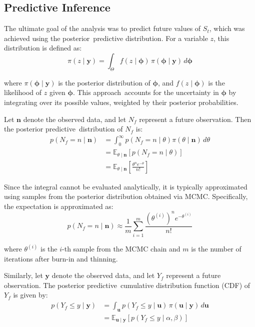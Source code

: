 \documentclass{Class/julia}
\begin{document}
\begin{figure}[!ht]
\end{figure}

\subsection{Predictive Inference}

The ultimate goal of the analysis was to predict future values of \( S_t \), which was achieved using the posterior~predictive distribution. For a variable \( z \), this distribution is defined as:
\[
\pi(z \mid \mathbf{y}) = \int_{\Theta} f(z \mid \mathbf{\phi}) \, \pi(\mathbf{\phi} \mid \mathbf{y}) \, d\mathbf{\phi}
\]

\noindent where \( \pi(\mathbf{\phi} \mid \mathbf{y}) \) is the posterior distribution of \( \mathbf{\phi} \), and \( f(z \mid \mathbf{\phi}) \) is the likelihood of \( z \) given \( \mathbf{\phi} \). This approach~accounts for the uncertainty in \( \mathbf{\phi} \) by integrating over its possible values, weighted by their posterior probabilities.

Let \( \mathbf{n} \) denote the observed data, and let \( N_f \) represent a future observation. Then the posterior predictive~distribution of \( N_f \) is:
\[
\begin{aligned}
p (N_f = n \mid \mathbf{n}) 
&= \int_0^{\infty} p(N_f = n \mid \theta) \pi(\theta \mid \mathbf{n}) \, d\theta \\
&= \mathbb{E}_{\theta \mid \mathbf{n}}\left[ p(N_f = n \mid \theta) \right] \\
&= \mathbb{E}_{\theta \mid \mathbf{n}}\left[ \frac{\theta^n e^{-\theta}}{n!} \right]
\end{aligned}
\]

\noindent Since the integral cannot be evaluated analytically, it is typically approximated using samples from the posterior distribution obtained via MCMC. Specifically, the expectation is approximated as:
\[
p (N_f = n \mid \mathbf{n}) \approx \frac{1}{m} \sum_{i=1}^{m} \frac{(\theta^{(i)})^n e^{-\theta^{(i)}}}{n!}
\]

\noindent where \( \theta^{(i)} \) is the \( i \)-th sample from the MCMC chain and \( m \) is the number of iterations after burn-in and thinning.

Similarly, let \( \mathbf{y} \) denote the observed data, and let \( Y_f \) represent a future observation. The posterior predictive~cumulative distribution function (CDF) of \( Y_f \) is given by:
\[
\begin{aligned}
p (Y_f \leq y \mid \mathbf{y}) 
&= \int_{\mathbf{u}} p(Y_f \leq y \mid \mathbf{u}) \, \pi(\mathbf{u} \mid \mathbf{y}) \, d\mathbf{u} \\
&= \mathbb{E}_{\mathbf{u} \mid \mathbf{y}}\left[ p(Y_f \leq y \mid \alpha, \beta) \right]
\end{aligned}
\]
\end{document}
